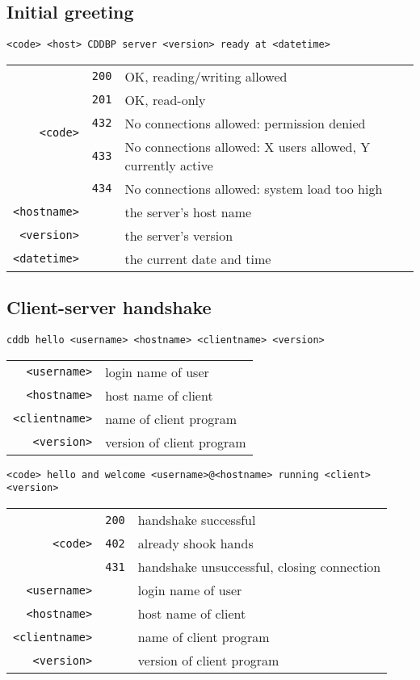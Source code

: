 \subsection{Initial greeting}
\begin{Verbatim}[frame=single,label=\textit{From Server},showspaces=true]
<code> <host> CDDBP server <version> ready at <datetime>
\end{Verbatim}
\begin{tabular}{rcl}
\multirow{5}{3em}{\texttt{<code>}}
& \texttt{200} & OK, reading/writing allowed \\
& \texttt{201} & OK, read-only \\
& \texttt{432} & No connections allowed: permission denied \\
& \texttt{433} & No connections allowed: X users allowed, Y currently active \\
& \texttt{434} & No connections allowed: system load too high \\
\texttt{<hostname>} & & the server's host name \\
\texttt{<version>} & & the server's version \\
\texttt{<datetime>} & & the current date and time
\end{tabular}

\subsection{Client-server handshake}
\begin{Verbatim}[frame=single,label=\textit{To Server},showspaces=true]
cddb hello <username> <hostname> <clientname> <version>
\end{Verbatim}
\begin{tabular}{rl}
\texttt{<username>} & login name of user \\
\texttt{<hostname>} & host name of client \\
\texttt{<clientname>} & name of client program \\
\texttt{<version>} & version of client program
\end{tabular}

\begin{Verbatim}[frame=single,label=\textit{From Server},showspaces=true]
<code> hello and welcome <username>@<hostname> running <client> <version>
\end{Verbatim}
\begin{tabular}{rcl}
\multirow{3}{3em}{\texttt{<code>}}
& \texttt{200} & handshake successful \\
& \texttt{402} & already shook hands \\
& \texttt{431} & handshake unsuccessful, closing connection \\
\texttt{<username>} & & login name of user \\
\texttt{<hostname>} & & host name of client \\
\texttt{<clientname>} & & name of client program \\
\texttt{<version>} & & version of client program
\end{tabular}

